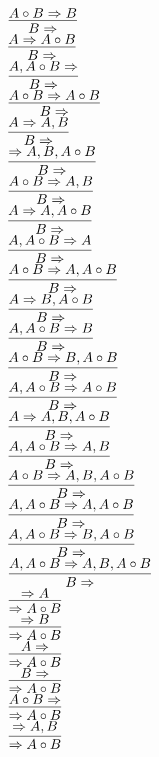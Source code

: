 \documentclass[11pt]{article}
\begin{document}
\begin{center}
\bigskip
\\$\infer{B\Rightarrow }{A\circ B\Rightarrow B}$
\bigskip
\\$\infer{B\Rightarrow }{A\Rightarrow A\circ B}$
\bigskip
\\$\infer{B\Rightarrow }{A, A\circ B\Rightarrow }$
\bigskip
\\$\infer{B\Rightarrow }{A\circ B\Rightarrow A\circ B}$
\bigskip
\\$\infer{B\Rightarrow }{A\Rightarrow A, B}$
\bigskip
\\$\infer{B\Rightarrow }{\Rightarrow A, B, A\circ B}$
\bigskip
\\$\infer{B\Rightarrow }{A\circ B\Rightarrow A, B}$
\bigskip
\\$\infer{B\Rightarrow }{A\Rightarrow A, A\circ B}$
\bigskip
\\$\infer{B\Rightarrow }{A, A\circ B\Rightarrow A}$
\bigskip
\\$\infer{B\Rightarrow }{A\circ B\Rightarrow A, A\circ B}$
\bigskip
\\$\infer{B\Rightarrow }{A\Rightarrow B, A\circ B}$
\bigskip
\\$\infer{B\Rightarrow }{A, A\circ B\Rightarrow B}$
\bigskip
\\$\infer{B\Rightarrow }{A\circ B\Rightarrow B, A\circ B}$
\bigskip
\\$\infer{B\Rightarrow }{A, A\circ B\Rightarrow A\circ B}$
\bigskip
\\$\infer{B\Rightarrow }{A\Rightarrow A, B, A\circ B}$
\bigskip
\\$\infer{B\Rightarrow }{A, A\circ B\Rightarrow A, B}$
\bigskip
\\$\infer{B\Rightarrow }{A\circ B\Rightarrow A, B, A\circ B}$
\bigskip
\\$\infer{B\Rightarrow }{A, A\circ B\Rightarrow A, A\circ B}$
\bigskip
\\$\infer{B\Rightarrow }{A, A\circ B\Rightarrow B, A\circ B}$
\bigskip
\\$\infer{B\Rightarrow }{A, A\circ B\Rightarrow A, B, A\circ B}$
\bigskip
\\$\infer{\Rightarrow A\circ B}{\Rightarrow A}$
\bigskip
\\$\infer{\Rightarrow A\circ B}{\Rightarrow B}$
\bigskip
\\$\infer{\Rightarrow A\circ B}{A\Rightarrow }$
\bigskip
\\$\infer{\Rightarrow A\circ B}{B\Rightarrow }$
\bigskip
\\$\infer{\Rightarrow A\circ B}{A\circ B\Rightarrow }$
\bigskip
\\$\infer{\Rightarrow A\circ B}{\Rightarrow A, B}$

\end{center}
\end{document}
